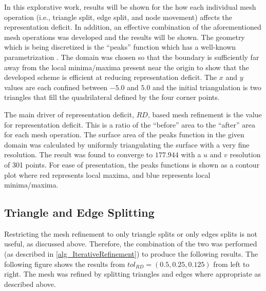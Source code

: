 In this explorative work, results will be shown for the how each
individual mesh operation (i.e., triangle split, edge split, and node 
movement) affects the representation deficit. In addition, an effective
combination of the aforementioned mesh operations was developed and the
results will be shown. The geometry which is being discretized is the
``peaks'' function which has a well-known parametrization
\cite{peaksMatlab}. The domain was chosen so that the boundary is
sufficiently far away from the local minima/maxima present near the origin to
show that the developed scheme is efficient at reducing representation
deficit. The $x$ and $y$ values are each confined between $-5.0$ and
$5.0$ and the initial triangulation is two triangles that fill the
quadrilateral defined by the four corner points.

The main driver of representation deficit, $RD$, based mesh refinement
is the value for representation deficit. This is a ratio of the
``before'' area to the ``after'' area for each mesh operation. The
surface area of the peaks function in the given domain was calculated by
uniformly triangulating the surface with a very fine resolution. The
result was found to converge to $177.944$ with a $u$ and $v$ resolution
of 301 points. For ease of presentation, the peaks functions is shown as
a contour plot where red represents local maxima, and blue represents
local minima/maxima.

\subsection{Triangle and Edge Splitting}
Restricting the mesh refinement to only triangle splits or only edges
splits is not useful, as discussed above. Therefore, the combination of
the two was performed (as described in \ref{alg_IterativeRefinement})
to produce the following results. The following figure shows the results
from $tol_{RD}=\left(0.5,0.25,0.125\right)$ from left to right. The mesh was
refined by splitting triangles and edges where appropriate as described
above.

